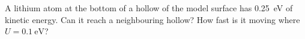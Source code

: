 
\begin{selfcheck}
A lithium atom at the bottom of a hollow of the model surface has
\SI{0.25}{\electronvolt} of kinetic energy. Can it reach a neighbouring
hollow? How fast is it moving where $U = \SI{0.1}{\electronvolt}$?
\end{selfcheck}
